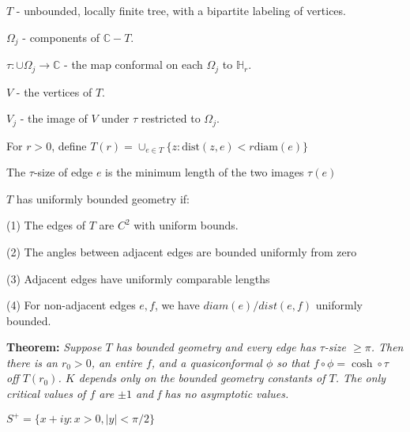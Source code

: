 \documentclass{beamer}
\begin{document}
\begin{frame}

{\tiny $T$ - unbounded, locally finite tree, with a bipartite labeling of vertices.

$\Omega_j$ - components of $\mathbb{C}-T$.

$\tau: \cup \Omega_j \rightarrow \mathbb{C}$ - the map conformal on each $\Omega_j$ to $\mathbb{H}_r$.

$V$ - the vertices of $T$. 

$V_j$ - the image of $V$ under $\tau$ restricted to $\Omega_j$.

For $r > 0$, define $T(r) = \cup_{e\in T} \{z : \textrm{dist}(z,e) < r\textrm{diam}(e) \}$

The $\tau$-size of edge $e$ is the minimum length of the two images $\tau(e)$

\vspace{2.5mm}

$T$ has uniformly bounded geometry if: 

\hspace{5mm} (1) The edges of $T$ are $C^2$ with uniform bounds. 

\hspace{5mm} (2) The angles between adjacent edges are bounded uniformly from zero

\hspace{5mm} (3) Adjacent edges have uniformly comparable lengths

\hspace{5mm} (4) For non-adjacent edges $e, f$, we have $diam(e)/dist(e,f)$ uniformly bounded. 

 }
\vspace{5mm}
{\bf Theorem:} {\it  Suppose $T$ has bounded geometry and every edge has $\tau$-size $\geq \pi$.  Then there is an $r_0 > 0$, an entire $f$, and a quasiconformal $\phi$ so that $f \circ \phi = \cosh \circ \tau$ off $T(r_0)$. $K$ depends only on the bounded geometry constants of $T$. The only critical values of $f$ are $\pm 1$ and f has no asymptotic values.}  

\end{frame}




\begin{frame} 

$S^+ = \{ x + iy : x > 0, |y| < \pi/2 \}$ 

\end{frame}
\end{document}
